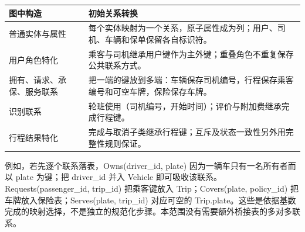 \documentclass[11pt,a4paper]{article}
\begin{document}
\par\begingroup\small\noindent
\begin{tabularx}{\linewidth}{p{3.3cm}X}
\toprule
图中构造 & 初始关系转换\\\midrule
普通实体与属性 & 每个实体映射为一个关系，原子属性成为列；用户、司机、车辆和保单保留各自标识符。\\
用户角色特化 & 乘客与司机继承用户键作为主外键；重叠角色不重复保存公共联系方式。\\
拥有、请求、承保、服务联系 & 把一端的键放到多端：车辆保存司机编号，行程保存乘客编号和可空车牌，保险保存车牌。\\
识别联系 & 轮班使用（司机编号，开始时间）；评价与附加费继承完成行程键。\\
行程结果特化 & 完成与取消子类继承行程键；互斥及状态一致性另外用完整性规则保证。\\
\bottomrule
\end{tabularx}
\par\endgroup
例如，若先逐个联系落表，Owns(driver\_\allowbreak{}id, plate) 因为一辆车只有一名所有者而以 plate 为键；把 driver\_\allowbreak{}id 并入 Vehicle 即可吸收该联系。Requests(passenger\_\allowbreak{}id, trip\_\allowbreak{}id) 把乘客键放入 Trip；Covers(plate, policy\_\allowbreak{}id) 把车牌放入保险表；Serves(plate, trip\_\allowbreak{}id) 对应可空的 Trip.plate。这些是依据基数完成的映射选择，不是独立的规范化步骤。本范围没有需要额外桥接表的多对多联系。

\clearpage
\end{document}
